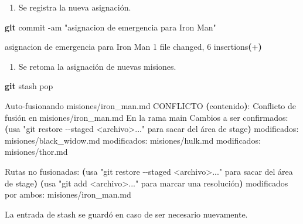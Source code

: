 \documentclass[
]{book}
\newenvironment{Shaded}{\begin{snugshade}}{\end{snugshade}}
\newcommand{\AttributeTok}[1]{\textcolor[rgb]{0.13,0.29,0.53}{#1}}
\newcommand{\BuiltInTok}[1]{#1}
\newcommand{\ErrorTok}[1]{\textcolor[rgb]{0.64,0.00,0.00}{\textbf{#1}}}
\newcommand{\ExtensionTok}[1]{#1}
\newcommand{\FunctionTok}[1]{\textcolor[rgb]{0.13,0.29,0.53}{\textbf{#1}}}
\newcommand{\KeywordTok}[1]{\textcolor[rgb]{0.13,0.29,0.53}{\textbf{#1}}}
\newcommand{\NormalTok}[1]{#1}
\newcommand{\StringTok}[1]{\textcolor[rgb]{0.31,0.60,0.02}{#1}}
\providecommand{\tightlist}{%
  \setlength{\itemsep}{0pt}\setlength{\parskip}{0pt}}
\begin{document}
\begin{enumerate}
\def\labelenumi{\arabic{enumi}.}
\setcounter{enumi}{4}
\tightlist
\item
  Se registra la nueva asignación.
\end{enumerate}

\begin{Shaded}
\begin{Highlighting}[]
\FunctionTok{git}\NormalTok{ commit }\AttributeTok{{-}am} \StringTok{"asignacion de emergencia para Iron Man"}
\end{Highlighting}
\end{Shaded}

\begin{Shaded}
\begin{Highlighting}[]
\ExtensionTok{[main}\NormalTok{ b307d16] asignacion de emergencia para Iron Man}
 \ExtensionTok{1}\NormalTok{ file changed, 6 insertions}\ErrorTok{(}\ExtensionTok{+}\KeywordTok{)}
\end{Highlighting}
\end{Shaded}

\begin{enumerate}
\def\labelenumi{\arabic{enumi}.}
\setcounter{enumi}{5}
\tightlist
\item
  Se retoma la asignación de nuevas misiones.
\end{enumerate}

\begin{Shaded}
\begin{Highlighting}[]
\FunctionTok{git}\NormalTok{ stash pop }
\end{Highlighting}
\end{Shaded}

\begin{Shaded}
\begin{Highlighting}[]
\ExtensionTok{Auto{-}fusionando}\NormalTok{ misiones/iron\_man.md}
\ExtensionTok{CONFLICTO} \ErrorTok{(}\ExtensionTok{contenido}\KeywordTok{)}\BuiltInTok{:}\NormalTok{ Conflicto de fusión en misiones/iron\_man.md}
\ExtensionTok{En}\NormalTok{ la rama main}
\ExtensionTok{Cambios}\NormalTok{ a ser confirmados:}
  \KeywordTok{(}\ExtensionTok{usa} \StringTok{"git restore {-}{-}staged \textless{}archivo\textgreater{}..."}\NormalTok{ para sacar del área de stage}\KeywordTok{)}
    \ExtensionTok{modificados:}\NormalTok{     misiones/black\_widow.md}
    \ExtensionTok{modificados:}\NormalTok{     misiones/hulk.md}
    \ExtensionTok{modificados:}\NormalTok{     misiones/thor.md}

\ExtensionTok{Rutas}\NormalTok{ no fusionadas:}
  \KeywordTok{(}\ExtensionTok{usa} \StringTok{"git restore {-}{-}staged \textless{}archivo\textgreater{}..."}\NormalTok{ para sacar del área de stage}\KeywordTok{)}
  \KeywordTok{(}\ExtensionTok{usa} \StringTok{"git add \textless{}archivo\textgreater{}..."}\NormalTok{ para marcar una resolución}\KeywordTok{)}
    \ExtensionTok{modificados}\NormalTok{ por ambos:  misiones/iron\_man.md}

\ExtensionTok{La}\NormalTok{ entrada de stash se guardó en caso de ser necesario nuevamente.}
\end{Highlighting}
\end{Shaded}
\end{document}

